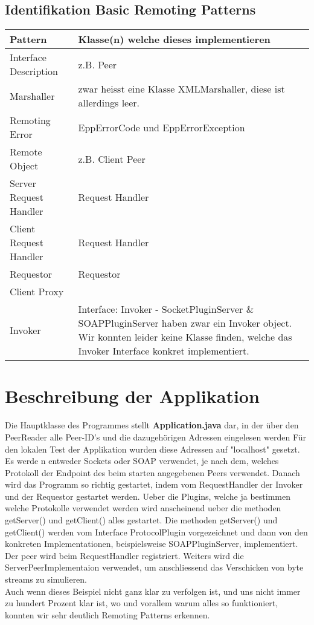 \documentclass[a4paper]{article}
\begin{document}
\subsection{Identifikation Basic Remoting Patterns}
\begin{center}
	\begin{tabular}{ | p{} | p{} |}
		\hline
		Pattern & Klasse(n) welche dieses implementieren \\
		\hline \hline
		Interface Description &  z.B. Peer  \\
		\hline
        Marshaller &  zwar heisst eine Klasse XMLMarshaller, diese ist allerdings leer. \\
		\hline
        Remoting Error & EppErrorCode und EppErrorException \\
		\hline
        Remote Object &  z.B. Client Peer\\
		\hline
        Server Request Handler & Request Handler \\
		\hline
          Client Request Handler &  Request Handler\\
		\hline
          Requestor & Requestor \\
		\hline
          Client Proxy &  \\
		\hline
         Invoker & Interface: Invoker - SocketPluginServer \& SOAPPluginServer haben zwar ein Invoker object. Wir konnten leider keine Klasse finden, welche das Invoker Interface konkret implementiert. \\
		\hline
	\end{tabular}
\end{center}
\section{Beschreibung der Applikation}
Die Hauptklasse des Programmes stellt \textbf{Application.java} dar, in der über den PeerReader alle Peer-ID's und die dazugehörigen Adressen eingelesen werden
Für den lokalen Test der Applikation wurden diese Adressen auf "localhost" gesetzt. Es werde n entweder Sockets oder SOAP verwendet, je nach dem, welches Protokoll der Endpoint des beim starten angegebenen Peers verwendet.  Danach wird das Programm so richtig gestartet, indem vom RequestHandler der Invoker und der Requestor gestartet werden. Ueber die Plugins, welche ja bestimmen welche Protokolle verwendet werden wird anscheinend ueber die methoden getServer() und getClient() alles gestartet. Die methoden getServer() und getClient() werden vom Interface ProtocolPlugin vorgezeichnet und dann von den konkreten Implementationen, beispielsweise SOAPPluginServer, implementiert.
Der peer wird beim RequestHandler registriert.
Weiters wird die ServerPeerImplementaion verwendet, um anschliessend das Verschicken von byte streams zu simulieren. \\
Auch wenn dieses Beispiel nicht ganz klar zu verfolgen ist, und uns nicht immer zu hundert Prozent klar ist, wo und vorallem warum alles so funktioniert, konnten wir sehr deutlich Remoting Patterns erkennen.
\newpage
\end{document}
